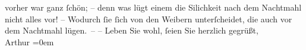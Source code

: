 \begin{ledgroupsized}[t]{13cm}
               vorher war ganz ſchön; – denn was lügt einem die Si{\geminationn}lichkeit nach dem {\pb}Nachtmahl \introOben{}nicht\introOben{} alles vor! – Wodurch ſie ſich von den
               Weibern unterſcheidet, die auch vor dem Nachtmahl lügen. –\pend
           \pstart
           – Leben Sie wohl, ſeien Sie herzlich gegrüßt, {\\[\baselineskip]}\spacefill\mbox{Arthur}\pend
           \leftskip=0em{}
         
         \endnumbering{}\end{ledgroupsized}  \newcommand{\dateiname}{L02961}\newcommand{\titel}{Arthur Schnitzler an Felix Salten, 17. 8. 1893}\newcommand{\editorInnen}{Martin Anton Müller und Laura Untner}
      